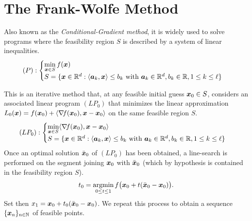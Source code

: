 
\section{The Frank-Wolfe Method}

Also known as the \emph{Conditional-Gradient method}, it is widely used to solve programs where the feasibility region $S$ is described by a system of linear inequalities.
\begin{equation*}
(P): \begin{cases} \displaystyle{\min_{\boldsymbol{x}\in S}f(\boldsymbol{x})} \\ S=\{ \boldsymbol{x} \in \mathbb{R}^d:  \langle \boldsymbol{a}_k, \boldsymbol{x} \rangle \leq b_k \text{ with } \boldsymbol{a}_k \in \mathbb{R}^d, b_k \in \mathbb{R}, 1\leq k \leq \ell  \}
\end{cases}
\end{equation*}

This is an iterative method that, at any feasible initial guess $\boldsymbol{x}_0 \in S$, considers an associated linear program $(LP_0)$ that minimizes the linear approximation $L_0(\boldsymbol{x}) = f(\boldsymbol{x}_0) + \langle \mathop{\nabla\! {f}}(\boldsymbol{x}_0), \boldsymbol{x} - \boldsymbol{x}_0 \rangle$ on the same feasible region $S$.
\begin{equation*}
(LP_0): \begin{cases} \displaystyle{\min_{\boldsymbol{x}\in S} \langle \mathop{\nabla\! {f}}(\boldsymbol{x}_0), \boldsymbol{x}-\boldsymbol{x}_0 \rangle} \\
 S =\{ \boldsymbol{x} \in \mathbb{R}^d:  \langle \boldsymbol{a}_k, \boldsymbol{x} \rangle \leq b_k \text{ with } \boldsymbol{a}_k \in \mathbb{R}^d, b_k \in \mathbb{R}, 1\leq k \leq \ell  \}
 \end{cases}
\end{equation*}
Once an optimal solution $\bar{\boldsymbol{x}}_0$ of $(LP_0)$ has been obtained, a line-search is performed on the segment joining $\boldsymbol{x}_0$ with $\bar{\boldsymbol{x}}_0$ (which by hypothesis is contained in the feasibility region $S$). 
\begin{equation*}
t_0 = \operatorname*{argmin}_{0\leq t \leq 1} f\big(\boldsymbol{x}_0 + t(\bar{\boldsymbol{x}}_0-\boldsymbol{x}_0) \big).
\end{equation*}
Set then $x_1 = \boldsymbol{x}_0 + t_0 (\bar{\boldsymbol{x}}_0-\boldsymbol{x}_0)$.  We repeat this process to obtain a sequence $\{\boldsymbol{x}_n\}_{n\in\mathbb{N}}$ of feasible points.

